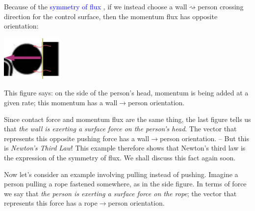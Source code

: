 \documentclass[a4paper,12pt,%
onecolumn,oneside,%
british%
]{memoir}
\renewcommand*{\|}[1][]{\nonscript\:#1\vert\nonscript\:\mathopen{}}
\newcommand*{\sect}{\S}%
\renewcommand*{\autoref}[3][\sect\,\ref]{\textcolor{blue}{#3}
\raisebox{0.6ex}{\color{blue}\miniscule%
\faIcon{angle-right}%
\;#1{#2}\;p.\,\pageref{#2}}}
\begin{document}
Because of the \autoref{def:symmetryflux}{symmetry of flux}, if we instead choose a wall$\rightsquigarrow$person crossing direction for the control surface, then the momentum flux has opposite orientation:\noprelistbreak
\begin{center}
  \includegraphics[height=6em]{images/person_push_flux_left.pdf}
\end{center}
This figure says: on the side of the person's head, momentum is being added at a given rate; this momentum has a wall$\rightarrow$person orientation.

Since contact force and momentum flux are the same thing, the last figure tells us that \emph{the wall is exerting a surface force on the person's head}. The vector that represents this opposite pushing force has a wall$\to$person orientation. -- But this is \emph{Newton's Third Law}! This example therefore shows that Newton's third law is the expression of the symmetry of flux. We shall discuss this fact again soon.

\medskip

Now let's consider an example involving pulling instead of pushing. Imagine a person pulling a rope fastened somewhere, as in the side figure. In terms of force we say that \emph{the person is exerting a surface force on the rope}; the vector that represents this force has a rope$\rightarrow$person orientation.
%
%
\end{document}
